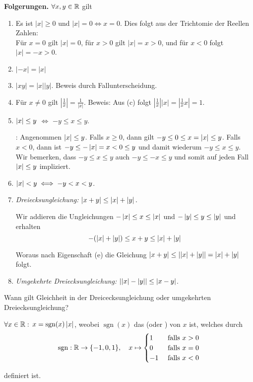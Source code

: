 \textbf{Folgerungen.} $\forall x, y \in \mathbb{R}$ gilt
\begin{enumerate}
  \item Es ist $|x| \geq 0$ und $|x| = 0 \iff x=0$. Dies folgt aus der Trichtomie der Reellen Zahlen:\\
  Für $x=0$ gilt $|x| = 0$, für $x>0$ gilt $|x|=x > 0$, und für $x<0$ folgt $|x| = -x > 0$.
  \item $|-x| = |x|$
  \item $|xy| = |x||y|$. Beweis durch Fallunterscheidung.
  \item Für $x\neq 0$ gilt $\left| \tfrac{1}{x} \right | = \tfrac{1}{|x|}$. Beweis: Aus (c) folgt $\left| \tfrac{1}{x} \right | {|x|} = \left| \tfrac{1}{x} x \right |  = 1$.
  \item $\left|x\right| \leq y$ $\iff$ $-y \leq x  \leq y$.
  \begin{prf}
    : Angenommen $\left|x\right| \leq y$. Falls $x \geq 0$, dann gilt $-y \leq 0 \leq x = \left|x\right| \leq y$. Falls $x < 0$, dann ist $-y \leq -\left|x\right| = x < 0 \leq y$ und damit wiederum $-y \leq x \leq y$. \\
     Wir bemerken, dass $-y \leq x \leq y$ auch $-y \leq -x \leq y$ und somit auf jeden Fall $\left|x\right| \leq y$ impliziert.
  \end{prf}
  \item $\left|x\right| < y \iff -y < x < y$.
  \item \emph{Dreiecksungleichung:} $\left|x+y\right| \leq \left|x\right| + \left|y\right|.$
  \begin{prf}
    Wir addieren die Ungleichungen $-\left|x\right| \leq x \leq \left|x\right|$ und $-\left|y\right| \leq y \leq \left|y\right|$ und erhalten
    \[
      -(\left|x\right| + \left|y\right|) \leq x+y \leq \left|x\right| + \left|y\right|
    \]

    Woraus nach Eigenschaft (e) die Gleichung $\left|x+y\right| \leq \left|\left|x\right| + \left|y\right|\right| = \left|x\right| + \left|y\right|$ folgt.
  \end{prf}
  \item \emph{Umgekehrte Dreiecksungleichung:} $\left|\left|x\right| - \left|y\right|\right| \leq \left|x-y\right|$.
\end{enumerate}

\begin{ex}
  Wann gilt Gleichheit in der Dreicecksungleichung oder umgekehrten Dreiecksungleichung?
\end{ex}

\begin{mydef-non}
  $\forall x \in \mathbb{R}:$ $x = \operatorname{sgn}(x) \left|x\right|$, weobei $\operatorname{sgn}(x)$ das  (oder ) von $x$ ist, welches durch
\[
  \operatorname{sgn}: \mathbb{R} \to \{-1,0,1\}, \quad x \mapsto \begin{cases}
    1  & \text{ falls } x > 0 \\
    0  & \text{ falls } x = 0 \\
    -1 & \text{ falls } x < 0
  \end{cases}
\]

definiert ist.
\end{mydef-non}

